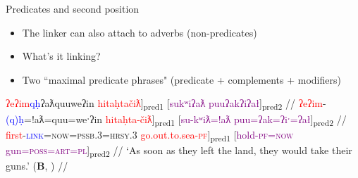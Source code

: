\begin{frame}{Predicates and second position}

\begin{itemize}
\item The linker can also attach to adverbs (non-predicates)
\item What's it linking? \pause
\item Two ``maximal predicate phrases" (predicate + complements + modifiers)
\end{itemize}

\ex[exno=29]
\begingl
\glpreamble {[}\textcolor{red}{ʔeʔim}\textcolor{blue}{qḥ}ʔaƛquuweʔin \textcolor{red}{hitaḥtačiƛ}{]\textsubscript{pred1}} {[}\textcolor{Purple}{sukʷiʔaƛ} \textcolor{Purple}{puuʔakʔiʔał}{]\textsubscript{pred2}} //
\gla {[}\textcolor{red}{ʔeʔim}-\textcolor{blue}{(q)ḥ}=!aƛ=quu=weˑʔin \textcolor{red}{hitaḥta-čiƛ}{]\textsubscript{pred1}} {[}\textcolor{Purple}{su-kʷiƛ=!aƛ} \textcolor{Purple}{puu=ʔak=ʔiˑ=ʔał}{]\textsubscript{pred2}} //
\glb {[}\textcolor{red}{first}-\textcolor{blue}{\textsc{link}}=\textsc{now}=\textsc{pssb.3}=\textsc{hrsy.3} \textcolor{red}{go.out.to.sea-\textsc{pf}}{]\textsubscript{pred1}} {[}\textcolor{Purple}{hold-\textsc{pf}=\textsc{now}} \textcolor{Purple}{gun=\textsc{poss}=\textsc{art}=\textsc{pl}}{]\textsubscript{pred2}} //
\glft `As soon as they left the land, they would take their guns.' (\textbf{B}, \citealt[395]{sapir1955}) //
\endgl
\xe \label{ex:takeoutguns}

\end{frame}

